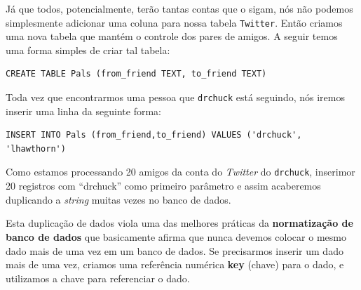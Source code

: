 
Já que todos, potencialmente, terão tantas contas que o sigam, nós não podemos
simplesmente adicionar uma coluna para nossa tabela {\tt Twitter}. Então
criamos uma nova tabela que mantém o controle dos pares de amigos. A seguir
temos uma forma simples de criar tal tabela:

\beforeverb
\begin{verbatim}
CREATE TABLE Pals (from_friend TEXT, to_friend TEXT)
\end{verbatim}
\afterverb
%
%
Toda vez que encontrarmos uma pessoa que {\tt drchuck} está seguindo, nós
iremos inserir uma linha da seguinte forma:

\beforeverb
\begin{verbatim}
INSERT INTO Pals (from_friend,to_friend) VALUES ('drchuck', 'lhawthorn')
\end{verbatim}
\afterverb
%
%
Como estamos processando 20 amigos da conta do {\it Twitter} do {\tt drchuck},
inserimor 20 registros com ``drchuck'' como primeiro parâmetro e assim
acaberemos duplicando a {\it string} muitas vezes no banco de dados.


Esta duplicação de dados viola uma das melhores práticas da {\bf normatização
  de banco de dados} que basicamente afirma que nunca devemos colocar o mesmo
dado mais de uma vez em um banco de dados. Se precisarmos inserir um dado mais
de uma vez, criamos uma referência numérica {\bf key} (chave) para o dado, e
utilizamos a chave para referenciar o dado.


